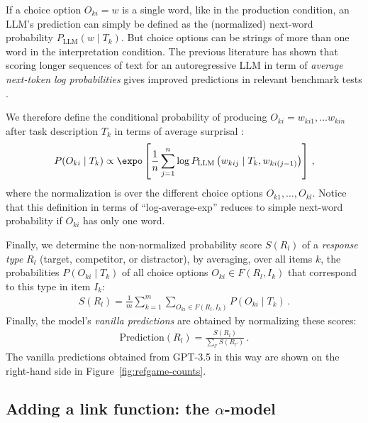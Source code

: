 \documentclass{article}
\begin{document}
If a choice option $O_{ki} = w$ is a single word, like in the production condition, an LLM's prediction can simply be defined as the (normalized) next-word probability $P_{\text{LLM}} (w \mid T_{k})$.
But choice options can be strings of more than one word in the interpretation condition.
The previous literature has shown that scoring longer sequences of text for an autoregressive LLM in term of \emph{average next-token log probabilities} gives improved predictions in relevant benchmark tests \citep[e.g.,][]{BrownMann2020:Language-Models}.

We therefore define the conditional probability of producing $O_{ki} = w_{ki1}, \dots w_{kin}$ after task description $T_{k}$ in terms of average surprisal :
%
\begin{align*}
P(O_{ki} \mid T_{k}) \propto \expo \left [  \frac{1}{n} \sum_{j=1}^n \log P_{\text{LLM}} \left(w_{kij} \mid T_{k}, w_{ki(j-1)} \right) \right ] \,,
\end{align*}
%
where the normalization is over the different choice options $O_{k1}, \dots, O_{kl}$.
Notice that this definition in terms of ``log-average-exp'' reduces to simple next-word probability if $O_{ki}$ has only one word.


Finally, we determine the non-normalized probability score $S(R_{l})$ of a \emph{response type} $R_{l}$ (target, competitor, or distractor), by averaging, over all items $k$, the probabilities $P(O_{ki} \mid T_{k})$ of all choice options $O_{ki} \in F(R_{l}, I_{k})$ that correspond to this type in item $I_{k}$:
%
\begin{align*}
S(R_{l}) = \frac{1}{m} \sum_{k=1}^{m} \sum_{O_{ki} \in F(R_{l}, I_{k})} P(O_{ki} \mid T_k)\,.
\end{align*}
%
Finally, the model's \textit{vanilla predictions} are obtained by normalizing these scores:
%
\begin{align*}
\text{Prediction}(R_{l}) = \frac{S(R_{l})}{\sum_{l'} S(R_{l'})}\,.
\end{align*}
%
The vanilla predictions obtained from GPT-3.5 in this way are shown on the right-hand side in Figure~\ref{fig:refgame-counts}.




\subsection{Adding a link function: the \(\alpha\)-model}
\label{adding-a-link-function-the-alpha-model}
\end{document}
